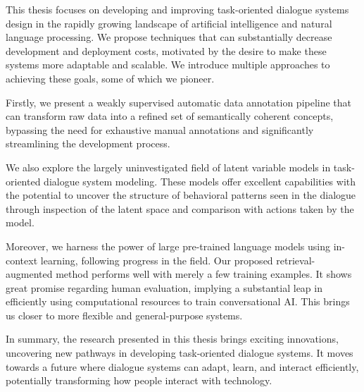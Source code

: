 This thesis focuses on developing and improving task-oriented dialogue systems design in the rapidly growing landscape of artificial intelligence and natural language processing.
We propose techniques that can substantially decrease development and deployment costs, motivated by the desire to make these systems more adaptable and scalable.
We introduce multiple approaches to achieving these goals, some of which we pioneer.

Firstly, we present a weakly supervised automatic data annotation pipeline that can transform raw data into a refined set of semantically coherent concepts, bypassing the need for exhaustive manual annotations and significantly streamlining the development process.

We also explore the largely uninvestigated field of latent variable models in task-oriented dialogue system modeling.
These models offer excellent capabilities with the potential to uncover the structure of behavioral patterns seen in the dialogue through inspection of the latent space and comparison with actions taken by the model.

Moreover, we harness the power of large pre-trained language models using in-context learning, following progress in the field.
Our proposed retrieval-augmented method performs well with merely a few training examples.
It shows great promise regarding human evaluation, implying a substantial leap in efficiently using computational resources to train conversational AI.
This brings us closer to more flexible and general-purpose systems.

In summary, the research presented in this thesis brings exciting innovations, uncovering new pathways in developing task-oriented dialogue systems.
It moves towards a future where dialogue systems can adapt, learn, and interact efficiently, potentially transforming how people interact with technology.